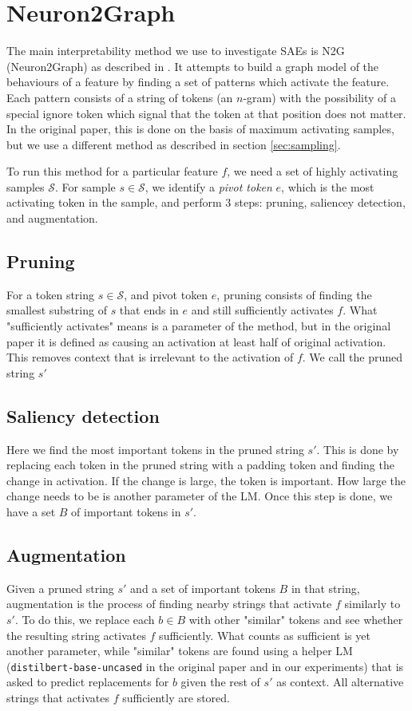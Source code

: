 \section{Neuron2Graph}
\label{sec:n2g}
The main interpretability method we use to investigate \acp{SAE} is \ac{N2G} (Neuron2Graph)
as described in \cite{foote_neuron_2023}.
It attempts to build a graph model of the behaviours of a feature 
by finding a set of patterns which activate the feature.
Each pattern consists of a string of tokens (an $n$-gram) 
with the possibility of a special ignore token 
which signal that the token at that position does not matter.
In the original paper, this is done on the basis of maximum activating samples, but we use a different method as described in section \ref{sec:sampling}.

To run this method for a particular feature $f$, 
we need a set of highly activating samples $\mathcal S$.
For sample $s\in\mathcal S$, we identify a \emph{pivot token} $e$, 
which is the most activating token in the sample, 
and perform 3 steps: pruning, saliencey detection, and augmentation.

\subsection{Pruning}
For a token string $s\in\mathcal S$, and pivot token $e$, 
pruning consists of finding the smallest substring of $s$ that ends in $e$ 
and still sufficiently activates $f$.
What "sufficiently activates" means is a parameter of the method, 
but in the original paper it is defined as causing an activation at least
half of original activation.
This removes context that is irrelevant to the activation of $f$.
We call the pruned string $s'$

\subsection{Saliency detection}
Here we find the most important tokens in the pruned string $s'$.
This is done by replacing each token in the pruned string 
with a padding token and finding the change in activation.
If the change is large, the token is important.
How large the change needs to be is another parameter of the \ac{LM}.
Once this step is done, we have a set $B$ of important tokens in $s'$.

\subsection{Augmentation}
Given a pruned string $s'$ and a set of important tokens $B$ in that string, 
augmentation is the process of finding nearby strings 
that activate $f$ similarly to $s'$.
To do this, we replace each $b\in B$ with other "similar" tokens and 
see whether the resulting string activates $f$ sufficiently.
What counts as sufficient is yet another parameter, 
while "similar" tokens are found using a helper \ac{LM} 
(\texttt{distilbert-base-uncased} in the original paper and in our experiments) 
that is asked to predict replacements for $b$ 
given the rest of $s'$ as context.
All alternative strings that activates $f$ sufficiently are stored.

